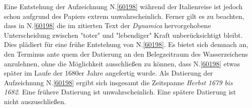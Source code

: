 \begin{ledgroup}
Eine Entstehung der Aufzeichnung N.\;\ref{60198} während der Italienreise ist jedoch schon aufgrund des Papiers extrem unwahrscheinlich.
Ferner gilt es zu beachten, dass in N.\;\ref{60198} die im zitierten Text der \textit{Dynamica}\cite{01354} hervorgehobene Unterscheidung zwischen "toter" und "lebendiger" Kraft unberücksichtigt bleibt.
Dies plädiert für eine frühe Entstehung von N.\;\ref{60198}.
Es bietet sich demnach an, den Terminus ante quem der Datierung an den Belegzeitraum des Wasserzeichens anzulehnen, ohne die Möglichkeit ausschließen zu können, dass N.\;\ref{60198} etwas später im Laufe der 1680er Jahre angefertig wurde.
\pend%
\pstart%
Als Datierung der Aufzeichnung N.\;\ref{60198} ergibt sich insgesamt die Zeitspanne \textit{Herbst 1679 bis 1682}.
Eine frühere Datierung ist unwahrscheinlich.
Eine spätere Datierung ist nicht auszuschließen.
\pend%
\end{ledgroup}%
%
\frenchspacing%
\newpage%

